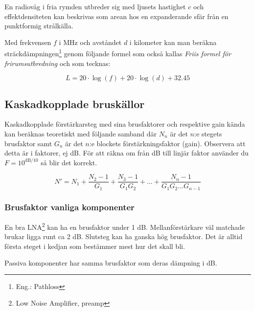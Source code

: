 \documentclass[10pt,swedish,a4paper]{article}
\begin{document}
En radiovåg i fria rymden utbreder sig med ljusets hastighet $c$ och effektdensiteten kan beskrivas som arean hos en expanderande sfär från en punktformig strålkälla.

Med frekvensen $f$ i MHz och avståndet $d$ i kilometer kan man beräkna sträck\-dämp\-ning\-en\footnote{Eng.: Pathloss} genom följande formel som också kallas \emph{Friis formel för frirumsutbredning} och som tecknas:

\begin{equation}
L=20\cdot \log(f) + 20\cdot \log(d) +32.45
\end{equation}

\subsection{Kaskadkopplade bruskällor}

Kaskadkopplade förstärkarsteg med sina brusfaktorer och respektive gain kända kan beräknas teoretiskt med följande samband där $N_n$ är det $n$:e stegets brusfaktor samt $G_n$ är det $n$:e blockets förstärkningsfaktor (gain). Observera att detta är i faktorer, ej dB. För att räkna om från dB till linjär faktor använder du $F=10^{\mathrm{dB}/10}$ så blir det korrekt.

\begin{equation}
N'=N_1+\frac{N_2-1}{G_1} + \frac{N_3-1}{G_1G_2} + ... + \frac{N_n-1}{G_1G_2...G_{n-1}}
\end{equation}

\subsubsection{Brusfaktor vanliga komponenter}

En bra LNA\footnote{Low Noise Amplifier, preamp} kan ha en brusfaktor under 1 dB. Mellanförstärkare väl matchade brukar ligga runt ca 2 dB. Slutsteg kan ha ganska hög brusfaktor. Det är alltid första steget i kedjan som bestämmer mest hur det skall bli.

Passiva komponenter har samma brusfaktor som deras dämpning i dB.
\end{document}
